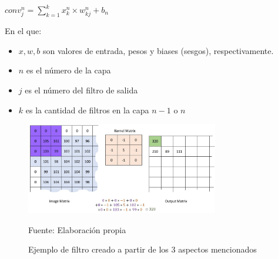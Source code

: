 		\begingroup\makeatletter{}\check@mathfonts
		\begin{center}
		${conv_j^n} ={\sum_{k=1}^k x_k^n \times w_{kj} ^n + b_n}$
		\end{center}
		\endgroup
		
		En el que:\vskip 0.1cm
		\begin{itemize}
			\item $x,w,b$ son valores de entrada, pesos y biases (sesgos), respectivamente.
			\item $n$ es el número de la capa
			\item $j$ es el número del filtro de salida
			\item $k$ es la cantidad de filtros en la capa $n-1$ o $n$
		\end{itemize}


		\begin{figure}[H]
		\begin{center}
		\includegraphics[width=0.75\textwidth]{images/marcoteorico/Convolution_calculation_borders}
		\end{center}
		\begin{center}
		\caption{\small{Ejemplo de filtro creado a partir de los 3 aspectos mencionados}}
		{\small{Fuente: Elaboración propia}}
		\end{center}
		\vspace{-1.9em}
		\end{figure}

		\vskip 0.3cm  
